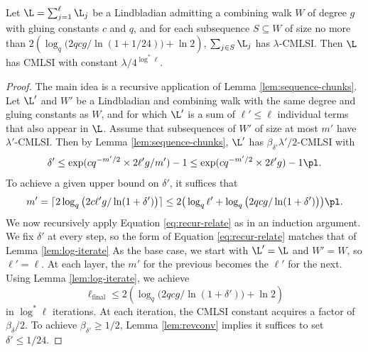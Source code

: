 \begin{lemma} \label{lem:2streams}
    Let $\L = \sum_{j=1}^\ell \L_j$ be a Lindbladian admitting a combining walk $W$ of degree $g$ with gluing constants $c$ and $q$, and for each subsequence $S \subseteq W$ of size no more than $2 (\log_q \big ( 2 q c g / \ln (1 + 1/24) \big ) + \ln 2)$, $\sum_{j \in S} \L_j$ has $\lambda$-CMLSI. Then $\L$ has CMLSI with constant $\lambda / 4^{\log^*\ell}$.
\end{lemma}
\begin{proof}
    The main idea is a recursive application of Lemma \ref{lem:sequence-chunks}. Let $\L'$ and $W'$ be a Lindbladian and combining walk with the same degree and gluing constants as $W$, and for which $\L'$ is a sum of $\ell' \leq \ell$ individual terms that also appear in $\L$. Assume that subsequences of $W'$ of size at most $m'$ have $\lambda'$-CMLSI. Then by Lemma \ref{lem:sequence-chunks}, $\L'$ has $\beta_{\delta'} \lambda'/2$-CMLSI with
    \begin{equation}
        \delta' \leq \exp ( c q^{-m'/2} \times 2 \ell' g / m' ) - 1 \leq \exp ( c q^{-m'/2} \times 2 \ell' g) - 1 \pl.
    \end{equation}
    To achieve a given upper bound on $\delta'$, it suffices that
    \begin{equation} \label{eq:recur-relate}
        m' = \lceil 2 \log_q \big ( 2 c \ell' g / \ln (1 + \delta') \big ) \rceil
             \leq 2 \big (  \log_q \ell' + \log_q \big ( 2 q c g / \ln (1 + \delta') \big ) \big ) \pl.
    \end{equation}
      We now recursively apply Equation \eqref{eq:recur-relate} as in an induction argument. We fix $\delta'$ at every step, so the form of Equation \eqref{eq:recur-relate} matches that of Lemma \ref{lem:log-iterate} As the base case, we start with $\L' = \L$ and $W' = W$, so $\ell' = \ell$. At each layer, the $m'$ for the previous becomes the $\ell'$ for the next. Using Lemma \ref{lem:log-iterate}, we achieve
      \begin{equation}
          \ell_{\mathrm{final}} \leq 2 (\log_q \big ( 2 q c g / \ln (1 + \delta') \big ) + \ln 2)
      \end{equation}
      in $\log^*\ell$ iterations. At each iteration, the CMLSI constant acquires a factor of $\beta_{\delta} /2$. To achieve $\beta_{\delta'} \geq 1/2$, Lemma \ref{lem:revconv} implies it suffices to set $\delta' \leq 1/24$.
\end{proof}
